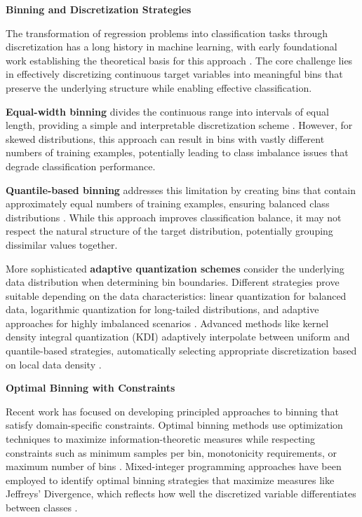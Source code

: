 \textbf{Binning and Discretization Strategies}

The transformation of regression problems into classification tasks through discretization has a long history in machine learning, with early foundational work establishing the theoretical basis for this approach \cite{torgo1996regression, torgo1997regression}. The core challenge lies in effectively discretizing continuous target variables into meaningful bins that preserve the underlying structure while enabling effective classification.

\textbf{Equal-width binning} divides the continuous range into intervals of equal length, providing a simple and interpretable discretization scheme \cite{berg2020deep, barkov2024efficient}. However, for skewed distributions, this approach can result in bins with vastly different numbers of training examples, potentially leading to class imbalance issues that degrade classification performance.

\textbf{Quantile-based binning} addresses this limitation by creating bins that contain approximately equal numbers of training examples, ensuring balanced class distributions \cite{berg2020deep, barkov2024efficient}. While this approach improves classification balance, it may not respect the natural structure of the target distribution, potentially grouping dissimilar values together.

More sophisticated \textbf{adaptive quantization schemes} consider the underlying data distribution when determining bin boundaries. Different strategies prove suitable depending on the data characteristics: linear quantization for balanced data, logarithmic quantization for long-tailed distributions, and adaptive approaches for highly imbalanced scenarios \cite{xiong2023deep}. Advanced methods like kernel density integral quantization (KDI) adaptively interpolate between uniform and quantile-based strategies, automatically selecting appropriate discretization based on local data density \cite{mccarter2024unmasking}.

\textbf{Optimal Binning with Constraints}

Recent work has focused on developing principled approaches to binning that satisfy domain-specific constraints. Optimal binning methods use optimization techniques to maximize information-theoretic measures while respecting constraints such as minimum samples per bin, monotonicity requirements, or maximum number of bins \cite{huang2022mbct}. Mixed-integer programming approaches have been employed to identify optimal binning strategies that maximize measures like Jeffreys' Divergence, which reflects how well the discretized variable differentiates between classes \cite{barkov2024efficient}.

